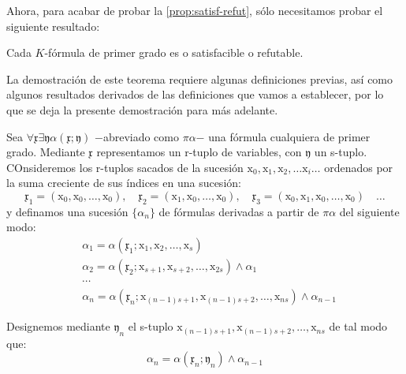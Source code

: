 Ahora, para acabar de probar la \autoref{prop:satisf-refut}, sólo necesitamos probar el siguiente resultado:

\begin{teorema} \label{thm:teoremaV}
    Cada $K$-fórmula de primer grado es o satisfacible o refutable.
\end{teorema}

La demostración de este teorema requiere algunas definiciones previas, así como algunos resultados derivados de las definiciones que vamos a establecer, por lo que
se deja la presente demostración para más adelante.

Sea $\forall \mathfrak{x} \exists \mathfrak{y} \alpha (\mathfrak{x} ; \mathfrak{y} )$ $-$abreviado como $\pi\alpha$$-$ una fórmula cualquiera de primer grado.
Mediante $\mathfrak{x}$ representamos un r-tuplo de variables, con $\mathfrak{y}$ un s-tuplo. COnsideremos los r-tuplos sacados de la sucesión $\text{x}_0, \text{x}_1,
\text{x}_2,\dots \text{x}_i \dots$ ordenados por la suma creciente de sus índices en una sucesión:
\begin{equation}
    \mathfrak{x}_1 = (\text{x}_0, \text{x}_0, \dots, \text{x}_0), \quad \mathfrak{x}_2 = (\text{x}_1, \text{x}_0, \dots, \text{x}_0), \quad 
    \mathfrak{x}_3 = (\text{x}_0, \text{x}_1, \text{x}_0, \dots, \text{x}_0) \quad \dots
\end{equation}
y definamos una sucesión $\{\alpha_n\}$ de fórmulas derivadas a partir de $\pi\alpha$ del siguiente modo:
\begin{equation}
    \begin{aligned}
        &\alpha_1 = \alpha(\mathfrak{x}_1 ; \text{x}_1, \text{x}_2, \dots, \text{x}_s) \\
        &\alpha_2 = \alpha(\mathfrak{x}_2 ; \text{x}_{s+1}, \text{x}_{s+2}, \dots, \text{x}_{2s}) \wedge \alpha_1 \\
        &\cdots \\ 
        &\alpha_n = \alpha(\mathfrak{x}_n ; \text{x}_{(n-1)s+1}, \text{x}_{(n-1)s+2}, \dots, \text{x}_{ns}) \wedge \alpha_{n-1}    
    \end{aligned}
\end{equation}

Designemos mediante $\mathfrak{y}_n$ el s-tuplo $\text{x}_{(n-1)s+1}, \text{x}_{(n-1)s+2}, \dots, \text{x}_{ns}$ de tal modo que:
\begin{equation} \label{eq:def-V}
    \alpha_n = \alpha(\mathfrak{x}_n ; \mathfrak{y}_n) \wedge \alpha_{n-1}
\end{equation}

